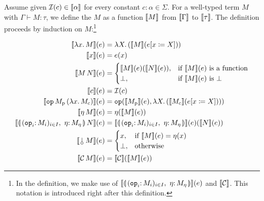 \begin{definition}\label{def:denotations}
  Assume given $\mathcal{I}(c) \in \llbracket \alpha \rrbracket$ for every constant
  $c : \alpha \in \Sigma$. For a well-typed term $M$ with
  $\Gamma \vdash M : \tau$, we define the 
  $M$ as a function $\llbracket M \rrbracket$ from $\llbracket \Gamma \rrbracket$ to $\llbracket \tau \rrbracket$. The
  definition proceeds by induction on $M$:\footnote{In the definition, we
    make use of $\sem{\cibanana}(e)$ and $\llbracket \mathcal{C} \rrbracket$. This notation is
    introduced right after this definition.}
  
  \begin{align*}
    \sem{\lam{x}{M}}(e) &= \lam{X}{(\sem{M}(\subst{e}{x}{X}))} \\
    \sem{x}(e) &= e(x) \\
    \sem{\ap{M}{N}}(e) &= \begin{cases}
      \sem{M}(e)(\sem{N}(e)),& \text{if $\sem{M}(e)$ is a function} \\
      \bot, & \text{if $\sem{M}(e)$ is $\bot$}
    \end{cases} \\
    \sem{c}(e) &= \II(c) \\
    \sem{\app{\op{op}}{M_\petitp}{(\lam{x}{M_\petitc})}}(e) &=
      \op{op}(\sem{M_\petitp}(e), \lam{X}{(\sem{M_\petitc}({\subst{e}{x}{X}}))}) \\
    \sem{\etaE{M}}(e) &= \eta(\sem{M}(e)) \\
    \sem{\ap{\cibanana}{N}}(e) &= \sem{\cibanana}(e)(\sem{N}(e)) \\
    \sem{\ap{\cherry}{M}}(e) &= \begin{cases}
      x, & \text{if $\sem{M}(e) = \eta(x)$} \\
      \bot, & \text{otherwise} \\
    \end{cases} \\
    \sem{\ap{\CC}{M}}(e) &= \sem{\CC}(\sem{M}(e))
  \end{align*}
\end{definition}

